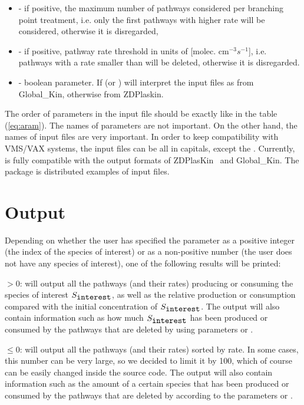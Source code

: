 \begin{description}
\begin{itemize}
\item{ - if positive, the maximum number of pathways considered per branching point treatment, i.e. only the first  pathways with higher rate will be considered, otherwise it is disregarded,}
\item{ - if positive, pathway rate threshold in units of [molec. cm$^{-3}$$s^{-1}$], i.e. pathways with a rate smaller than  will be deleted, otherwise it is disregarded.}
\item{ - boolean parameter. If  (or )} \pump{} will interpret the input files as from Global\_Kin, otherwise from ZDPlaskin.
\end{itemize}
\end{description}

The order of parameters in the input file should be exactly like in the table (\ref{eq:aram}). The names of parameters are not important. On the other hand, the names of input files are very important. In order to keep compatibility with VMS/VAX systems, the input files can be all in capitals, except the . Currently, \pump{} 
is fully compatible with the output formats of ZDPlasKin~\cite{Zdplaskin,Flitti2009/EPJAP,Qtplaskin} and Global\_Kin.  The \pump{} package 
is distributed examples of input files. 


\section{Output}
\label{sec_3_2}

Depending on whether the user has specified the  parameter as a positive integer (the index of the species of interest) or as a non-positive number (the user does not have any species of interest), one of the following results will be printed:

 $> 0$: \pump{} will output all the pathways (and their rates) producing or consuming the species of interest $S_{\verb"interest"}$, as well as the relative production or consumption compared with the initial concentration of $S_{\verb"interest"}$. The output will also contain information such as how much $S_{\verb"interest"}$ has been produced or consumed by the pathways that are deleted by \pump{} using parameters  or . 

 $\leq 0$: \pump{} will output all the pathways (and their rates) sorted by rate. In some cases, this number can be very large, so we decided to limit it by 100, which of course can be easily changed inside the \pump{} source code. The output will also contain information such as the amount of a certain species that has been produced or consumed by the pathways that are deleted by \pump{} according to the parameters  or . 













